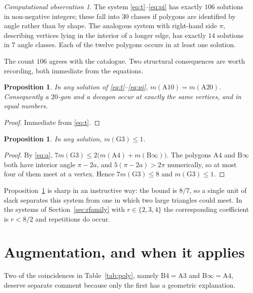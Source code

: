 \documentclass[11pt,a4paper]{article}
\theoremstyle{plain}
\newtheorem{proposition}[theorem]{Proposition}
\theoremstyle{definition}
\theoremstyle{remark}
\newtheorem{observation}[theorem]{Computational observation}
\begin{document}
\begin{observation}\label{obs:106}
The system \eqref{eq:t}--\eqref{eq:pi} has exactly $106$ solutions in
non-negative integers; these fall into $30$ classes if polygons are identified by
angle rather than by shape. The analogous system with right-hand side $\pi$,
describing vertices lying in the interior of a longer edge, has exactly $14$
solutions in $7$ angle classes. Each of the twelve polygons occurs in at least
one solution.
\end{observation}

The count $106$ agrees with the catalogue. Two structural consequences are worth
recording, both immediate from the equations.

\begin{proposition}
In any solution of \eqref{eq:t}--\eqref{eq:pi}, $m(\mathrm{A}10)=m(\mathrm{A}20)$.
Consequently a $20$-gon and a decagon occur at exactly the same vertices, and in
equal numbers.
\end{proposition}

\begin{proof}
Immediate from \eqref{eq:t}.
\end{proof}

\begin{proposition}\label{prop:g3}
In any solution, $m(\mathrm{G}3)\le1$.
\end{proposition}

\begin{proof}
By \eqref{eq:a},
$7m(\mathrm{G}3)\le 2\bigl(m(\mathrm{A}4)+m(\mathrm{B}\infty)\bigr)$. The
polygons $\mathrm{A}4$ and $\mathrm{B}\infty$ both have interior angle
$\pi-2a$, and $5(\pi-2a)>2\pi$ numerically, so at most four of them meet at a
vertex. Hence $7m(\mathrm{G}3)\le8$ and $m(\mathrm{G}3)\le1$.
\end{proof}

Proposition~\ref{prop:g3} is sharp in an instructive way: the bound is $8/7$, so
a single unit of slack separates this system from one in which two large
triangles could meet. In the systems of Section~\ref{sec:rfamily} with
$r\in\{2,3,4\}$ the corresponding coefficient is $r<8/2$ and repetitions do occur.

\section{Augmentation, and when it applies}\label{sec:star}

Two of the coincidences in Table~\ref{tab:poly}, namely
$\mathrm{B}4=\mathrm{A}3$ and $\mathrm{B}\infty=\mathrm{A}4$, deserve separate
comment because only the first has a geometric explanation.
\end{document}
